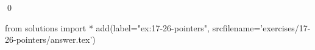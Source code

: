 
\begin{ex}
  \label{ex:17-26-pointers}
  
  \qed
\end{ex}
\begin{python0}
from solutions import *
add(label="ex:17-26-pointers",
    srcfilename='exercises/17-26-pointers/answer.tex')
\end{python0}
